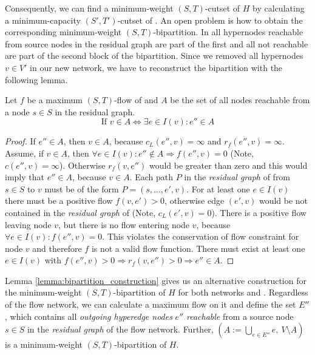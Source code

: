 Consequently, we can find a minimum-weight $(S,T)$-cutset of $H$ by calculating
a minimum-capacity $(S',T')$-cutset of . An open problem is how to obtain the 
corresponding minimum-weight $(S,T)$-bipartition. In  all hypernodes
reachable from source nodes in the residual graph are part of the first and 
all not reachable are part of the second block of the bipartition. Since we removed 
all hypernodes $v \in V'$ in our new network, we have to reconstruct the bipartition
with the following lemma.

\begin{lemma}
\label{lemma:bipartition_construction}
Let $f$ be a maximum $(S,T)$-flow  of  and $A$ be the set of all nodes reachable
from a node $s \in S$ in the residual graph.
\[ \text{If } v \in A \Leftrightarrow \exists e \in I(v): e'' \in A \]
\end{lemma}

\begin{proof}
If $e'' \in A$, then $v \in A$, because $c_L(e'',v) = \infty$ and $r_f(e'',v) = \infty$.
Assume, if $v \in A$, then $\forall e \in I(v): e'' \notin A \Rightarrow f(e'',v) = 0$ (Note, $c(e'',v) = \infty$). 
Otherwise $r_f(v, e'')$ would be greater than zero and this would imply that $e'' \in A$,
because $v \in A$. Each path $P$ in the \emph{residual graph} of  from $s \in S$ to $v$ must be of the 
form $P = (s,\ldots,e',v)$. For at least one $e \in I(v)$ there must be a positive flow $f(v,e') > 0$,
otherwise edge $(e',v)$ would be not contained in the \emph{residual graph} of  (Note, $c_L(e',v) = 0$).
There is a positive flow leaving node $v$, but there is no flow entering node $v$, because
$\forall e \in I(v): f(e'',v) = 0$. This violates the conservation of flow
constraint for node $v$ and therefore $f$ is not a valid flow function. There must exist at least one $e \in I(v)$
with $f(e'',v) > 0 \Rightarrow r_f(v,e'') > 0 \Rightarrow e'' \in A$.
\end{proof}

Lemma \ref{lemma:bipartition_construction} gives us an alternative construction for the minimum-weight $(S,T)$-bipartition
of $H$ for both networks  and . Regardless of the flow network, we can 
calculate a maximum flow on it and define the set $E''$, which contains all \emph{outgoing hyperedge
nodes} $e''$ \emph{reachable} from a source node $s \in S$ in the \emph{residual graph} of the flow network. 
Further, $(A := \bigcup_{e \in E''} e,\ V\setminus A)$ is a 
minimum-weight $(S,T)$-bipartition of $H$.


